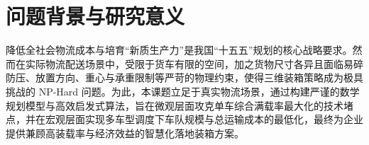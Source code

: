 \documentclass{MMCStyle}
\begin{document}
	\begin{abstract}

本研究针对物流配送中的三维装箱与多车型协同调度问题。该问题受限于车厢空间和货物尺寸差异，加之易碎防压、定向放置、重心稳定、承重限制等复杂物理约束，构成典型的NP-Hard难题。这在快递电商、零担物流等行业中成为制约运输效率和降低成本的关键技术瓶颈。本课题建立基于混合整数规划的严谨数学模型，系统涵盖空间不重叠、载重、边界、方向与堆叠等多维度约束，设计融合极点搜索、动态贪心选择与多目标局部优化的高效启发式算法，实现秒级至分钟级求解。

问题一针对单车型装载优化，其核心挑战在于如何在多重物理约束下，同时最大化空间利用率和载重利用率。不同货物类型的尺寸、重量、易碎性差异巨大，传统的按体积或重量排序方法难以获得高质量方案。本算法采用多维度综合评分体系，系统考虑空间填充效率、结构稳定性和成本因素，对车型1和车型2分别实现了89.87\%和95.18\%的空间利用率以及53.53\%和73.44\%的载重利用率，接近理论上界。在3000件异构货物的测试上，分别仅需17辆车型1或8辆车型2完成全部运输，验证了算法的高效性。

问题二针对多车型协同调度，其主要困难在于如何在两个车型之间做出最优权衡决策。不同车型具有不同的容量、成本结构和装载特性，在"车辆数最少"与"成本最低"两种优化导向下可能产生不同结果。本研究通过全局优化框架，对所有可行方案进行系统评估。结果表明，在两种目标下均优选8辆车型2方案（总成本5600元），相比17辆车型1（总成本12600元）可节省车辆52.9\%、成本55.6\%。

为验证算法鲁棒性与泛化能力，进行了多维度敏感性分析与大规模数据测试。敏感性分析表明，算法对关键参数波动$\pm 20\%$保持高度稳定，在车辆成本、货物权重等变量变化时均能给出稳定方案，时间复杂度为O(n)。该方案为物流企业带来可量化效益-年运100批次可节省百万元级成本，车辆减少52.9\%显著降低碳排放，符合国家"双碳"战略。研究成果可广泛应用于快递电商、零担、冷链运输等领域。
\end{abstract}
    
	{  %
	\tableofcontents}
	\newpage
	\clearpage
	\pagestyle{fancy}

\section{问题背景与研究意义}

\hspace{2em}降低全社会物流成本与培育“新质生产力”是我国“十五五”规划的核心战略要求。然而在实际物流配送场景中，受限于货车有限的空间，加之货物尺寸各异且面临易碎防压、放置方向、重心与承重限制等严苛的物理约束，使得三维装箱策略成为极具挑战的 NP-Hard 问题。为此，本课题立足于真实物流场景，通过构建严谨的数学规划模型与高效启发式算法，旨在微观层面攻克单车综合满载率最大化的技术堵点，并在宏观层面实现多车型调度下车队规模与总运输成本的最低化，最终为企业提供兼顾高装载率与经济效益的智慧化落地装箱方案。
\end{document}
